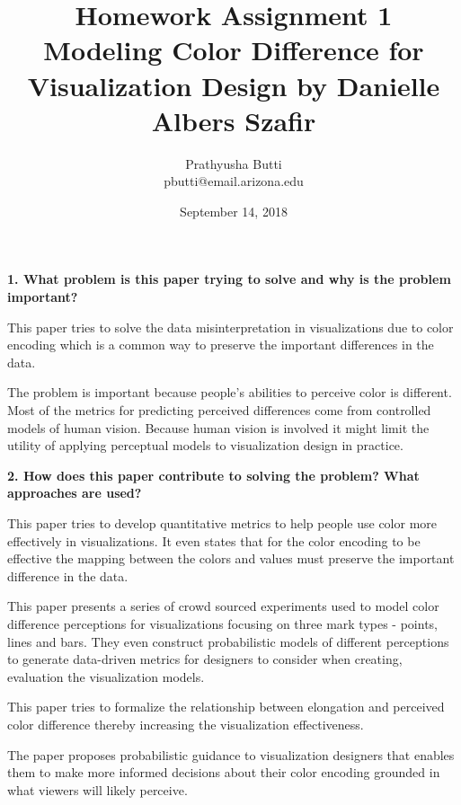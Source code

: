 \documentclass{article}[12pt]
\begin{document}
\title{Homework Assignment 1 \\
	\large Modeling Color Difference for Visualization Design by Danielle Albers Szafir \\}
\date{September 14, 2018}

\author{
   Prathyusha Butti \\
   pbutti@email.arizona.edu
}

\maketitle

\noindent
{\bf 1. What problem is this paper trying to solve and why is the problem
   important?}

{
	This paper tries to solve the data misinterpretation in visualizations due to color encoding which is a common way to preserve the important differences in the data.
	
	The problem is important because people's abilities to perceive color is different. Most of the metrics for predicting perceived differences come from controlled models of human vision. Because human vision is involved it might limit the utility of applying perceptual models to visualization design in practice.
}




\vspace{2ex}\noindent
{\bf 2. How does this paper contribute to solving the problem? What approaches are
   used? }

{
	This paper tries to develop quantitative metrics to help people use color more effectively in visualizations. It even states that for the color encoding to be effective the mapping between the colors and values must preserve the important difference in the data.
	
	This paper presents a series of crowd sourced experiments used to model color difference perceptions for visualizations focusing on three mark types - points, lines and bars. They even construct probabilistic models of different perceptions to generate data-driven metrics for designers to consider when creating, evaluation the visualization models.
	
	This paper tries to formalize the relationship between elongation and perceived color difference thereby increasing the visualization effectiveness.
	
	The paper proposes probabilistic guidance to visualization designers that enables them to make more informed decisions about their color encoding grounded in what viewers will likely perceive.
}
\end{document}
